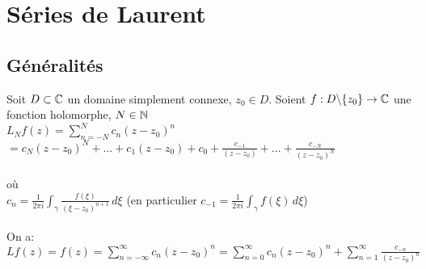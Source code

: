 \chapter[Séries de Laurent]{Séries de Laurent}

\section{Généralités}

\begin{myTheorem}
	Soit $D \subset \mathbb{C}$ 
	un domaine simplement connexe, $z_{0} \in D$. Soient $f: D\backslash \{z_{0}\}\rightarrow \mathbb{C}$ une fonction holomorphe, $N \in \mathbb{N}$
	\\
	$L_{N} f(z) = \sum_{n=-N}^N c_{n}(z-z_{0})^n$\\$=c_{N}(z-z_{0})^N+...+c_{1}(z-z_{0})+c_{0}+\frac{c_{-1}}{(z-z_{0})}+...+\frac{c_{-N}}{(z-z_{0})^N}$
	\\
	\\où
	\\$c_{n}=\frac{1}{2\pi i}\int_\gamma \frac{f(\xi)}{(\xi-z_{0})^{n+1}}\,d\xi$
	(en particulier $c_{-1}=\frac{1}{2\pi i}\int_\gamma f(\xi)\,d\xi$)
	\\
	\\On a:
	$L f(z)=f(z)=\sum_{n=-\infty}^\infty c_{n}(z-z_{0})^n=\sum_{n=0}^\infty c_{n}(z-z_{0})^n + \sum_{n=1}^\infty \frac{c_{-n}}{(z-z_{0})^n}$\\
\end{myTheorem}

